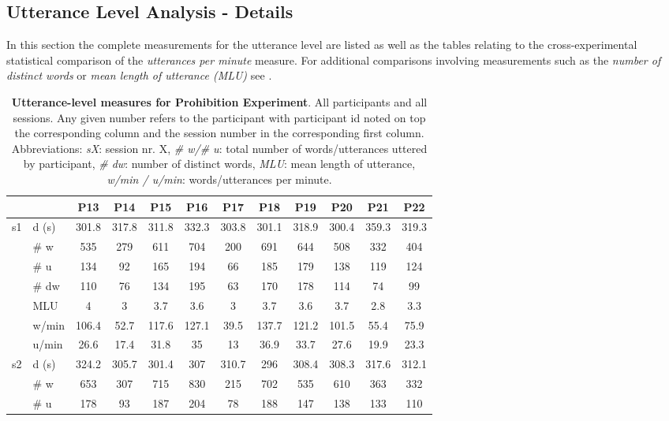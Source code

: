 \begin{screenonly}
\subsection{Utterance Level Analysis - Details}
In this section the complete measurements for the utterance level are listed as well as the tables relating to the cross-experimental statistical comparison of 
the \emph{utterances per minute} measure. For additional comparisons involving measurements such as the \emph{number of distinct words} or 
\emph{mean length of utterance (MLU)} see \cite{Foerster2013}.
\begin{table*}[h]
\caption{\textbf{Utterance-level measures for Prohibition Experiment}. All participants and all sessions. Any given number
    refers to the participant with participant id noted on top the corresponding column and the session number in the corresponding
    first column. Abbreviations: \textsl{sX}: session nr. X, \textsl{\# w/\# u}: total number of words/utterances uttered by participant,
    \textsl{\# dw}: number of distinct words, \textsl{MLU}: mean length of utterance, \textsl{w/min / u/min}: words/utterances per minute.}
  \label{tbl_ul_pro}
  \begin{tabular*}{\hsize}{@{\extracolsep{\fill}}clcccccccccc}
    \toprule
    & & P13 & P14 & P15 & P16 & P17 & P18 & P19 & P20 & P21 & P22\\
    \midrule
    \multirow{7}{*}{s1} & d (s) & 301.8 & 317.8 & 311.8 & 332.3 & 303.8 & 301.1 & 318.9 & 300.4 & 359.3 & 319.3\\
    & \# w & 535 & 279 & 611 & 704 & 200 & 691 & 644 & 508 & 332 & 404\\
    & \# u & 134 & 92 & 165 & 194 & 66 & 185 & 179 & 138 & 119 & 124\\
    & \# dw & 110 & 76 & 134 & 195 & 63 & 170 & 178 & 114 & 74 & 99\\
    & MLU & 4 & 3 & 3.7 & 3.6 & 3 & 3.7 & 3.6 & 3.7 & 2.8 & 3.3\\
    & w/min & 106.4 & 52.7 & 117.6 & 127.1 & 39.5 & 137.7 & 121.2 & 101.5 & 55.4 & 75.9\\
    & u/min & 26.6 & 17.4 & 31.8 & 35 & 13 & 36.9 & 33.7 & 27.6 & 19.9 & 23.3\\
    \cmidrule{2-12}
    \multirow{7}{*}{s2} & d (s) & 324.2 & 305.7 & 301.4 & 307 & 310.7 & 296 & 308.4 & 308.3 & 317.6 & 312.1\\
    & \# w & 653 & 307 & 715 & 830 & 215 & 702 & 535 & 610 & 363 & 332\\
    & \# u & 178 & 93 & 187 & 204 & 78 & 188 & 147 & 138 & 133 & 110\\

\end{tabular*}
\end{table*}
\end{screenonly}
